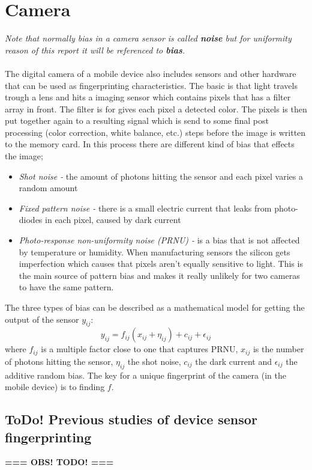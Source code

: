 \section{Camera}\label{sec:char:camera}
\textit{Note that normally bias in a camera sensor is called \textbf{noise} but for uniformity reason of this report it will be referenced to \textbf{bias}.}\\
\\
The digital camera of a mobile device also includes sensors and other hardware that can be used as fingerprinting characteristics. The basic is that light travels trough a lens and hits a imaging sensor which contains pixels that has a filter array in front. The filter is for gives each pixel a detected color. The pixels is then put together again to a resulting signal which is send to some final post processing (color correction, white balance, etc.) steps before the image is written to the memory card. In this process there are different kind of bias that effects the image;
\begin{itemize}
	\item[] \textit{Shot noise -} the amount of photons hitting the sensor and each pixel varies a random amount
	\item[] \textit{Fixed pattern noise - }there is a small electric current that leaks from photo-diodes in each pixel, caused by dark current
	\item[] \textit{Photo-response non-uniformity noise (PRNU) -} is a bias that is not affected by temperature or humidity. When manufacturing sensors the silicon gets imperfection which causes that pixels aren't equally sensitive to light. This is the main source of pattern bias and makes it really unlikely for two cameras to have the same pattern.
\end{itemize}
The three types of bias can be described as a mathematical model for getting the output of the sensor $y_{ij}$:
$$y_{ij}=f_{ij}(x_{ij}+\eta_{ij})+c_{ij}+\epsilon_{ij}$$
where $f_{ij}$ is a multiple factor close to one that captures PRNU, $x_{ij}$ is the number of photons hitting the sensor, $\eta_{ij}$ the shot noise, $c_{ij}$ the dark current and $\epsilon_{ij}$ the additive random bias. The key for a unique fingerprint of the camera (in the mobile device) is to finding $f$.
\cite[]{sensor:camera:DCIdent}

\subsection{\textbf{ToDo! } Previous studies of device sensor fingerprinting}
\textbf{=== OBS! TODO! ===}